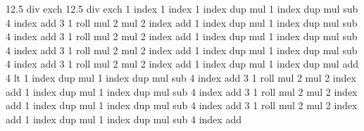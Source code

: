 {\pgfpoint{-50bp}{-50bp}}
{\pgfpoint{50bp}{50bp}}{}
{
  12.5 div exch 12.5 div exch
  1 index 1 index
  1 index dup mul %
  1 index dup mul %
  sub             %
  4 index add     %
  3 1 roll
  mul 2 mul       %
  2 index add     %
  1 index dup mul %
  1 index dup mul %
  sub             %
  4 index add     %
  3 1 roll
  mul 2 mul       %
  2 index add     %
  1 index dup mul %
  1 index dup mul %
  sub             %
  4 index add     %
  3 1 roll
  mul 2 mul       %
  2 index add     %
  1 index dup mul %
  1 index dup mul %
  sub             %
  4 index add     %
  3 1 roll
  mul 2 mul       %
  2 index add     %
  1 index dup mul 1 index dup mul add
  4 lt {
  1 index dup mul %
  1 index dup mul %
  sub             %
  4 index add     %
  3 1 roll
  mul 2 mul       %
  2 index add     %
  1 index dup mul %
  1 index dup mul %
  sub             %
  4 index add     %
  3 1 roll
  mul 2 mul       %
  2 index add     %
  1 index dup mul %
  1 index dup mul %
  sub             %
  4 index add     %
  3 1 roll
  mul 2 mul       %
  2 index add     %
  1 index dup mul %
  1 index dup mul %
  sub             %
  4 index add     %
}}
